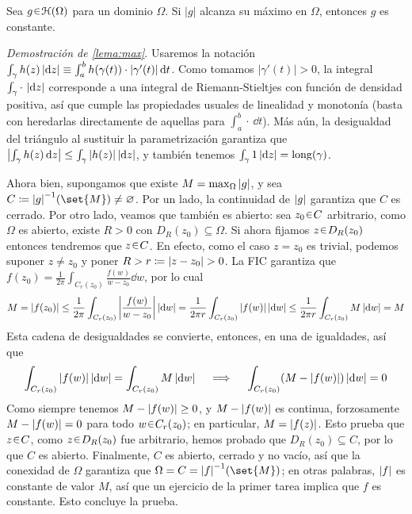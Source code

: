 \begin{sol}
\begin{lema}
Sea $g\en\mathcal{H}(\Omega)$ para un dominio $\Omega$. Si $|g|$ alcanza su máximo en $\Omega$, entonces $g$ es constante.
\end{lema}
\noindent\emph{Demostración de \cref{lema:max}}.
Usaremos la notación $\int_\gamma h(z) \,\abs{\dd{z}} \equiv \int^b_a h(\gamma(t))\cdot\abs{\gamma'(t)} \dd{t}$. Como tomamos $|\gamma'(t)| > 0$, la integral $\int_\gamma{\cdot}\ \abs{\dd{z}}$ corresponde a una integral de Riemann-Stieltjes con función de densidad positiva, así que cumple las propiedades usuales de linealidad y monotonía (basta con heredarlas directamente de aquellas para $\int^b_a {\cdot}\,\dd{t}$). Más aún, la desigualdad del triángulo al sustituir la parametrización garantiza que $\abs\big{\int_\gamma h(z) \dd{z}} \leq \int_\gamma \abs{h(z)}\,\abs{\dd{z}}$, y también tenemos $\int_\gamma1\,\abs{\dd{z}} = \operatorname{long}(\gamma)$.\par
Ahora bien, supongamos que existe $M = \max_{\Omega}\abs{g}$, y sea $C \coloneq \abs{g}^{-1}(\set{M}) \neq \varnothing$. Por un lado, la continuidad de $\abs{g}$ garantiza que $C$ es cerrado. Por otro lado, veamos que también es abierto: sea $z_0 \en C$ arbitrario, como $\Omega$ es abierto, existe $R>0$ con $D_R(z_0) \subseteq\Omega$. Si ahora fijamos $z\en D_R(z_0)$ entonces tendremos que $z\en C$. En efecto, como el caso $z = z_0$ es trivial, podemos suponer $z \neq z_0$ y poner $R > r \coloneq \abs{z - z_0} > 0$. La FIC garantiza que $f(z_0) = \frac{1}{2\pi}\int_{C_r(z_0)} \frac{f(w)}{w-z_0} \dd{w}$, por lo cual
\[
M 
= \abs{f(z_0)}
\leq \frac{1}{2\pi}\int_{C_r(z_0)} \abs{\frac{f(w)}{w-z_0}} \,\abs{\dd{w}}
= \frac{1}{2\pi r}\int_{C_r(z_0)} \abs{f(w)} \,\abs{\dd{w}}
\leq \frac{1}{2\pi r}\int_{C_r(z_0)} M \,\abs{\dd{w}} = M
\]
Esta cadena de desigualdades se convierte, entonces, en una de igualdades, así que
\[
\int_{C_r(z_0)} \abs{f(w)} \,\abs{\dd{w}}
= \int_{C_r(z_0)} M \,\abs{\dd{w}}%
\quad\implies\quad
\int_{C_r(z_0)}( M -\abs{f(w)}) \,\abs{\dd{w}} = 0
\]
Como siempre tenemos $M - \abs{f(w)} \ge 0$, y $M -\abs{f(w)}$ es continua, forzosamente $M -\abs{f(w)} = 0$ para todo $w\en C_r(z_0)$; en particular, $M = \abs{f(z)}$. Esto prueba que $z \en C$, como $z\en D_R(z_0)$ fue arbitrario, hemos probado que $D_R(z_0) \subseteq C$, por lo que $C$ es abierto. Finalmente, $C$ es abierto, cerrado y no vacío, así que la conexidad de $\Omega$ garantiza que $\Omega = C = \abs{f}^{-1}(\set{M})$; en otras palabras, $\abs{f}$ es constante de valor $M$, así que un ejercicio de la primer tarea implica que $f$ es constante. Esto concluye la prueba.\vspace{1em}\\

\end{sol}
